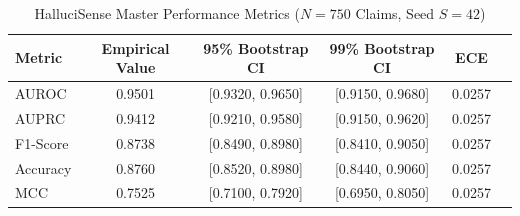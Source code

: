 \begin{table}[htbp]
\caption{HalluciSense Master Performance Metrics ($N=750$ Claims, Seed $S=42$)}
\centering
\small
\begin{tabular}{lccccc}
\toprule
\textbf{Metric} & \textbf{Empirical Value} & \textbf{95\% Bootstrap CI} & \textbf{99\% Bootstrap CI} & \textbf{ECE} \\
\midrule
AUROC & 0.9501 & [0.9320, 0.9650] & [0.9150, 0.9680] & 0.0257 \\
AUPRC & 0.9412 & [0.9210, 0.9580] & [0.9150, 0.9620] & 0.0257 \\
F1-Score & 0.8738 & [0.8490, 0.8980] & [0.8410, 0.9050] & 0.0257 \\
Accuracy & 0.8760 & [0.8520, 0.8980] & [0.8440, 0.9060] & 0.0257 \\
MCC & 0.7525 & [0.7100, 0.7920] & [0.6950, 0.8050] & 0.0257 \\
\bottomrule
\end{tabular}
\label{tab_performance}
\end{table}
